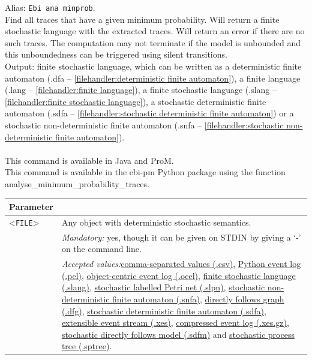 {Alias: \texttt{Ebi ana minprob}.\\
Find all traces that have a given minimum probability.
Will return a finite stochastic language with the extracted traces.
Will return an error if there are no such traces.
The computation may not terminate if the model is unbounded and this unboundedness can be triggered using silent transitions.\\
\noindent Output: finite stochastic language, which can be written as a deterministic finite automaton (.dfa -- \cref{filehandler:deterministic finite automaton}), a finite language (.lang -- \cref{filehandler:finite language}), a finite stochastic language (.slang -- \cref{filehandler:finite stochastic language}), a stochastic deterministic finite automaton (.sdfa -- \cref{filehandler:stochastic deterministic finite automaton}) or a stochastic non-deterministic finite automaton (.snfa -- \cref{filehandler:stochastic non-deterministic finite automaton}).\\
\\This command is available in Java and ProM.
\\This command is available in the ebi-pm Python package using the function analyse\_minimum\_probability\_traces.
\begin{tabularx}{\linewidth}{lX}
\toprule
Parameter \\\midrule
<\texttt{FILE}>&Any object with deterministic stochastic semantics.\\
&\textit{Mandatory:} \quad yes, though it can be given on STDIN by giving a `-' on the command line.\\
&\textit{Accepted values:}\quad \hyperref[filehandler:comma-separated values]{comma-separated values (.csv)}, \hyperref[filehandler:Python event log]{Python event log (.pel)}, \hyperref[filehandler:object-centric event log]{object-centric event log (.ocel)}, \hyperref[filehandler:finite stochastic language]{finite stochastic language (.slang)}, \hyperref[filehandler:stochastic labelled Petri net]{stochastic labelled Petri net (.slpn)}, \hyperref[filehandler:stochastic non-deterministic finite automaton]{stochastic non-deterministic finite automaton (.snfa)}, \hyperref[filehandler:directly follows graph]{directly follows graph (.dfg)}, \hyperref[filehandler:stochastic deterministic finite automaton]{stochastic deterministic finite automaton (.sdfa)}, \hyperref[filehandler:extensible event stream]{extensible event stream (.xes)}, \hyperref[filehandler:compressed event log]{compressed event log (.xes.gz)}, \hyperref[filehandler:stochastic directly follows model]{stochastic directly follows model (.sdfm)} and \hyperref[filehandler:stochastic process tree]{stochastic process tree (.sptree)}.\\

\end{tabularx}}
